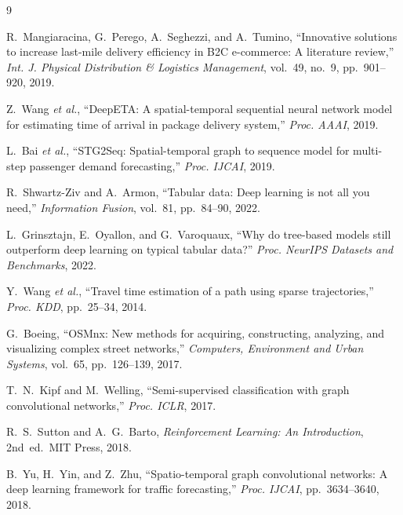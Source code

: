 \documentclass[conference]{IEEEtran}
\begin{document}
\begin{thebibliography}{9}

R.~Mangiaracina, G.~Perego, A.~Seghezzi, and A.~Tumino,
``Innovative solutions to increase last-mile delivery efficiency in B2C
e-commerce: A literature review,''
\textit{Int. J. Physical Distribution \& Logistics Management}, vol.~49,
no.~9, pp.~901--920, 2019.

Z.~Wang \textit{et al.},
``DeepETA: A spatial-temporal sequential neural network model for estimating
time of arrival in package delivery system,''
\textit{Proc. AAAI}, 2019.

L.~Bai \textit{et al.},
``STG2Seq: Spatial-temporal graph to sequence model for multi-step passenger
demand forecasting,''
\textit{Proc. IJCAI}, 2019.

R.~Shwartz-Ziv and A.~Armon,
``Tabular data: Deep learning is not all you need,''
\textit{Information Fusion}, vol.~81, pp.~84--90, 2022.

L.~Grinsztajn, E.~Oyallon, and G.~Varoquaux,
``Why do tree-based models still outperform deep learning on typical tabular
data?''
\textit{Proc. NeurIPS Datasets and Benchmarks}, 2022.

Y.~Wang \textit{et al.},
``Travel time estimation of a path using sparse trajectories,''
\textit{Proc. KDD}, pp.~25--34, 2014.

G.~Boeing,
``OSMnx: New methods for acquiring, constructing, analyzing, and visualizing
complex street networks,''
\textit{Computers, Environment and Urban Systems}, vol.~65, pp.~126--139,
2017.

T.~N.~Kipf and M.~Welling,
``Semi-supervised classification with graph convolutional networks,''
\textit{Proc. ICLR}, 2017.

R.~S.~Sutton and A.~G.~Barto,
\textit{Reinforcement Learning: An Introduction}, 2nd~ed.\  MIT Press, 2018.

B.~Yu, H.~Yin, and Z.~Zhu,
``Spatio-temporal graph convolutional networks: A deep learning framework for
traffic forecasting,''
\textit{Proc. IJCAI}, pp.~3634--3640, 2018.

\end{thebibliography}
\end{document}
